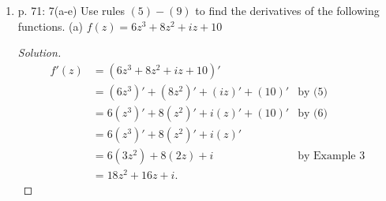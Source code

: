 \begin{enumerate}
(b) $\lim _{z \rightarrow 2} \frac{z^2+3}{i z}$
\begin{proof}[Solution]
	\begin{align*}
		&= \frac{2^2 + 3}{2 i} \\
		&= \frac{7}{2i} \\
		&= -\frac{7}{2}i
	.\end{align*}
	
\end{proof}

(c) $\lim _{z \rightarrow 3 i} \frac{z^2+9}{z-3 i}$
\begin{proof}[Solution]
	\begin{align*}
		&= \lim_{z \to  3 i}\frac{(z+3i)(z-3i)}{z-3i} \\
		&= \lim_{z \to  3 i}z+3i \\
		&= 3i+3i \\
		&= 6i 
	.\end{align*}
\end{proof}

	\item p. 71: 7(a-e)
	Use rules $(5)-(9)$ to find the derivatives of the following functions.
(a) $f(z)=6 z^3+8 z^2+i z+10$
\begin{proof}[Solution]
	\begin{align*}
		f'(z) &= \left( 6z^3 + 8z^2 + iz + 10 \right)'  \\
		      &= (6z^3)' + (8z^2)' + (iz)' + (10)' & \text{by (5)} \\
		      &= 6(z^3)' + 8(z^2)' + i(z)' + (10)' & \text{by (6)} \\
		      &= 6(z^3)' + 8(z^2)' + i(z)'  \\
		      &= 6(3z^2) + 8(2z) + i  & \text{by Example 3} \\
		      &= 18z^2 + 16z + i
	.\end{align*}
\end{proof}


\end{enumerate}
